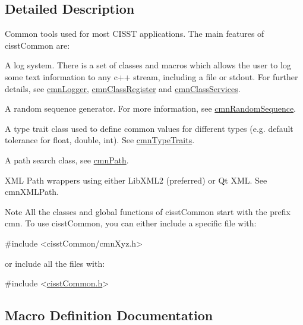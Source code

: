 \subsection{Detailed Description}
Common tools used for most C\+I\+S\+S\+T applications. The main features of cisst\+Common are\+:


\begin{DoxyItemize}
\item A log system. There is a set of classes and macros which allows the user to log some text information to any c++ stream, including a file or stdout. For further details, see \hyperlink{classcmn_logger}{cmn\+Logger}, \hyperlink{classcmn_class_register}{cmn\+Class\+Register} and \hyperlink{classcmn_class_services}{cmn\+Class\+Services}.
\item A random sequence generator. For more information, see \hyperlink{classcmn_random_sequence}{cmn\+Random\+Sequence}.
\item A type trait class used to define common values for different types (e.\+g. default tolerance for float, double, int). See \hyperlink{classcmn_type_traits}{cmn\+Type\+Traits}.
\item A path search class, see \hyperlink{classcmn_path}{cmn\+Path}.
\item X\+M\+L Path wrappers using either Lib\+X\+M\+L2 (preferred) or Qt X\+M\+L. See cmn\+X\+M\+L\+Path.
\end{DoxyItemize}

\begin{DoxyNote}{Note}
All the classes and global functions of cisst\+Common start with the prefix cmn. To use cisst\+Common, you can either include a specific file with\+: 
\begin{DoxyCode}
\textcolor{preprocessor}{#include <cisstCommon/cmnXyz.h>}
\end{DoxyCode}
 or include all the files with\+: 
\begin{DoxyCode}
\textcolor{preprocessor}{#include <\hyperlink{cisst_common_8h}{cisstCommon.h}>}
\end{DoxyCode}
 
\end{DoxyNote}


\subsection{Macro Definition Documentation}
\hypertarget{group__cisst_common_ga6a12b7031ea38ac5bf5937b8633c97ff}{}
